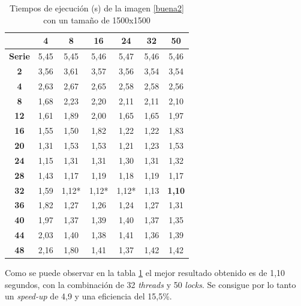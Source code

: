 \begin{table}[H]
	\centering
	\small
	\begin{tabular}{|c|c|c|c|c|c|c|}
		\hline
		{\bf \backslashbox{Threads}{Locks}}   & {\bf 4} & {\bf 8} & {\bf 16} & {\bf 24} & {\bf 32} & {\bf 50} \\ \hline
		{\bf Serie}  & 5,45    & 5,45    & 5,46     & 5,47     & 5,46     & 5,46     \\ \hline
		{\bf 2}  & 3,56    & 3,61    & 3,57     & 3,56     & 3,54     & 3,54     \\ \hline
		{\bf 4}  & 2,63    & 2,67    & 2,65     & 2,58     & 2,58     & 2,56     \\ \hline
		{\bf 8}  & 1,68    & 2,23    & 2,20     & 2,11     & 2,11     & 2,10     \\ \hline
		{\bf 12} & 1,61    & 1,89    & 2,00     & 1,65     & 1,65     & 1,97     \\ \hline
		{\bf 16} & 1,55    & 1,50    & 1,82     & 1,22     & 1,22     & 1,83     \\ \hline
		{\bf 20} & 1,31    & 1,53    & 1,53     & 1,21     & 1,23     & 1,53     \\ \hline
		{\bf 24} & 1,15    & 1,31    & 1,31     & 1,30     & 1,31     & 1,32     \\ \hline
		{\bf 28} & 1,43    & 1,17    & 1,19     & 1,18     & 1,19     & 1,17     \\ \hline
		{\bf 32} & 1,59    & 1,12*    & 1,12*     & 1,12*     & 1,13     & \textbf{1,10}     \\ \hline
		{\bf 36} & 1,82    & 1,27    & 1,26     & 1,24     & 1,27     & 1,31     \\ \hline
		{\bf 40} & 1,97    & 1,37    & 1,39     & 1,40     & 1,37     & 1,35     \\ \hline
		{\bf 44} & 2,03    & 1,40    & 1,38     & 1,41     & 1,36     & 1,39     \\ \hline
		{\bf 48} & 2,16    & 1,80    & 1,41     & 1,37     & 1,42     & 1,42     \\ \hline
	\end{tabular}
	\captionsetup{justification=centering}	
	\caption{Tiempos de ejecuci\'{o}n (s) de la imagen \ref{buena2} con un tama\~{n}o de 1500x1500}
	\label{img2-1500}
\end{table}

Como se puede observar en la tabla \ref{img2-1500} el mejor resultado obtenido es de 1,10 segundos, con la combinaci\'{o}n de 32 \textit{threads} y 50 \textit{locks}. Se consigue por lo tanto un \textit{speed-up} de 4,9 y una eficiencia del 15,5\%. 

